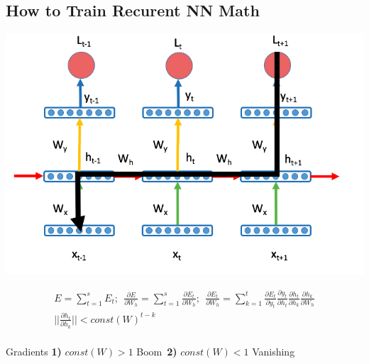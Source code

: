 \documentclass{beamer}
\begin{document}
	\subsection*{How to Train Recurent NN Math}
	\begin{frame}
		
			\begin{center}
				\includegraphics[scale=0.22]{img/rnnw2}
			\end{center}		

			\begin{align*}
				E = \sum_{t=1}^s E_t;~~
				\frac{\partial E}{\partial W_h} = \sum_{t=1}^s \frac{\partial E_t}{\partial W_h};~~ 
				\frac{\partial E_t}{\partial W_h} = 
				\sum_{k=1}^t  \frac{\partial E_t}{\partial y_t} \frac{\partial y_t}{\partial h_t}
				\frac{\partial h_t}{\partial h_k} \frac{\partial h_k}{\partial W_h}\\
				||\frac{\partial h_t}{\partial h_k}|| < const(W)^{t-k}~~~~~~~~~~~~~~~~~~~~~~~~~\\
			\end{align*}
			\vspace{-1cm}
			\begin{tcolorbox}[colback=gray!0, colframe=red!90]
				\centering Gradients \textbf{1)} $const(W) > 1$  Boom~\textbf{2)} $const(W) < 1$  Vanishing 
			\end{tcolorbox}

	\end{frame}
	
\end{document}
